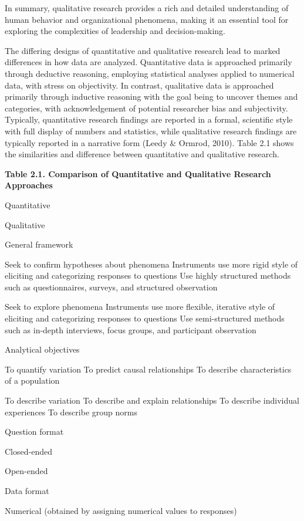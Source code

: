 \documentclass[
  letterpaper,
  DIV=11,
  numbers=noendperiod]{scrreprt}
\begin{document}
In summary, qualitative research provides a rich and detailed
understanding of human behavior and organizational phenomena, making it
an essential tool for exploring the complexities of leadership and
decision-making.

The differing designs of quantitative and qualitative research lead to
marked differences in how data are analyzed. Quantitative data is
approached primarily through deductive reasoning, employing statistical
analyses applied to numerical data, with stress on objectivity. In
contrast, qualitative data is approached primarily through inductive
reasoning with the goal being to uncover themes and categories, with
acknowledgement of potential researcher bias and subjectivity.
Typically, quantitative research findings are reported in a formal,
scientific style with full display of numbers and statistics, while
qualitative research findings are typically reported in a narrative form
(Leedy \& Ormrod, 2010). Table 2.1 shows the similarities and difference
between quantitative and qualitative research.

\textbf{Table 2.1. Comparison of Quantitative and Qualitative Research
Approaches}

Quantitative

Qualitative

General framework

Seek to confirm hypotheses about phenomena Instruments use more rigid
style of eliciting and categorizing responses to questions Use highly
structured methods such as questionnaires, surveys, and structured
observation

Seek to explore phenomena Instruments use more flexible, iterative style
of eliciting and categorizing responses to questions Use semi-structured
methods such as in-depth interviews, focus groups, and participant
observation

Analytical objectives

To quantify variation To predict causal relationships To describe
characteristics of a population

To describe variation To describe and explain relationships To describe
individual experiences To describe group norms

Question format

Closed-ended

Open-ended

Data format

Numerical (obtained by assigning numerical values to responses)
\end{document}
